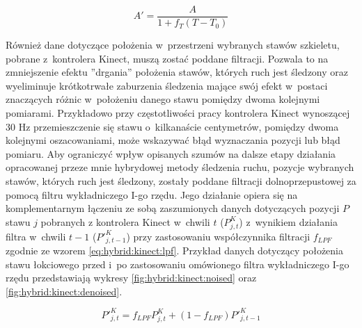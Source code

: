 \begin{equation}
	A' = \frac{A}{1+f_T (T-T_0)}
	\label{eq:hybrid:temperatureCorrection}
\end{equation}
						
Również dane dotyczące położenia w~przestrzeni wybranych stawów szkieletu, pobrane z~kontrolera Kinect, muszą zostać poddane filtracji. Pozwala to na zmniejszenie efektu ''drgania'' położenia stawów, których ruch jest śledzony oraz wyeliminuje krótkotrwałe zaburzenia śledzenia mające swój efekt w~postaci znaczących różnic w~położeniu danego stawu pomiędzy dwoma kolejnymi pomiarami. Przykładowo przy częstotliwości pracy kontrolera Kinect wynoszącej 30 Hz przemieszczenie się stawu o~kilkanaście centymetrów, pomiędzy dwoma kolejnymi oszacowaniami, może wskazywać błąd wyznaczania pozycji lub błąd pomiaru. Aby ograniczyć wpływ opisanych szumów na dalsze etapy działania opracowanej przeze mnie hybrydowej metody śledzenia ruchu, pozycje wybranych stawów, których ruch jest śledzony, zostały poddane filtracji dolnoprzepustowej za pomocą filtru wykładniczego I-go rzędu. Jego działanie opiera się na komplementarnym łączeniu ze sobą zaszumionych danych dotyczących pozycji $P$ stawu $j$ pobranych z kontrolera Kinect w~chwili $t$ ($P^K_{j,t}$) z~wynikiem działania filtra w~chwili $t-1$ ($P'^K_{j,t-1}$) przy zastosowaniu współczynnika filtracji $f_{LPF}$ zgodnie ze wzorem \ref{eq:hybrid:kinect:lpf}. Przykład danych dotyczący położenia stawu łokciowego przed i~po zastosowaniu omówionego filtra wykładniczego I-go rzędu przedstawiają wykresy \ref{fig:hybrid:kinect:noised} oraz \ref{fig:hybrid:kinect:denoised}.
						
\begin{equation}
	\label{eq:hybrid:kinect:lpf}
	P'^K_{j,t} = f_{LPF} P^K_{j,t} + (1-f_{LPF})P'^K_{j,t-1}
\end{equation}
						
